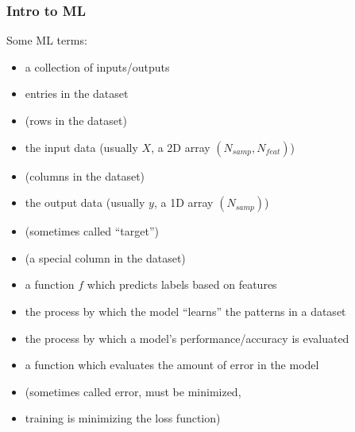 \documentclass{beamer}
\begin{document}
\begin{frame}	
	\frametitle{Intro to ML}
	
	\begin{block}{Some ML terms:}
		\scriptsize
		\begin{itemize}[itemindent=4.0em]
			\item[Dataset:] a collection of inputs/outputs
			\item[Samples:] entries in the dataset
			\item[] (rows in the dataset)
			\item[Features:] the input data (usually $X$, a 2D array $(N_{samp},N_{feat})$)
			\item[] (columns in the dataset)
			\item[Labels:] the output data (usually $y$, a 1D array $(N_{samp})$) \\
			\item[] (sometimes called ``target'')
			\item[] (a special column in the dataset)
			\item[Model:] a function $f$ which predicts labels based on features
			\item[Training:] the process by which the model ``learns'' the patterns in a dataset
			\item[Testing:] the process by which a model's performance/accuracy is evaluated
			\item[Loss function:] a function which evaluates the amount of error in the model
			\item[] (sometimes called error, must be minimized,
			\item[] training is minimizing the loss function)
		\end{itemize}
	\end{block}
	
\end{frame}
\end{document}
